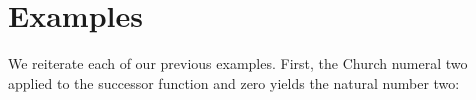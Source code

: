 \begin{fence}
\begin{code}
\AgdaSymbol{\{}\AgdaSpace{}%
\AgdaSpace{}%
\AgdaSymbol{:}\AgdaSpace{}%
\AgdaSpace{}%
\AgdaSpace{}%
\AgdaSymbol{\}}\<%
\\
\>[2][@{}l@{\AgdaIndent{0}}]%
\>[4]\AgdaSpace{}%
\AgdaSpace{}%
\AgdaSpace{}%
\<%
\\
%
\>[4]%
\>[1366I]\AgdaSpace{}%
\AgdaSpace{}%
\<%
\\
\>[.][@{}l@{}]\<[1366I]%
\>[6]\AgdaComment{------}\<%
\\
%
\>[4]\AgdaSpace{}%
\AgdaSpace{}%
\AgdaSpace{}%
\<%
\\
%
\\[\AgdaEmptyExtraSkip]%
\>[0]\AgdaSpace{}%
\AgdaSymbol{:}\AgdaSpace{}%
\AgdaSpace{}%
\AgdaSymbol{\{}\AgdaSpace{}%
\AgdaSymbol{\}}\AgdaSpace{}%
\AgdaSymbol{\{}\AgdaSpace{}%
\AgdaSpace{}%
\AgdaSymbol{:}\AgdaSpace{}%
\AgdaSpace{}%
\AgdaSpace{}%
\AgdaSymbol{\}}\<%
\\
\>[0][@{}l@{\AgdaIndent{0}}]%
\>[2]%
\>[1382I]\AgdaSpace{}%
\AgdaSpace{}%
\<%
\\
\>[.][@{}l@{}]\<[1382I]%
\>[4]\AgdaComment{------}\<%
\\
%
\>[2]\AgdaSpace{}%
\AgdaSpace{}%
\AgdaSpace{}%
\<%
\\
\>[0]\AgdaSpace{}%
\AgdaSpace{}%
\AgdaSymbol{=}\AgdaSpace{}%
\<%
\end{code}
\end{fence}

\hypertarget{examples}{%
\section{Examples}\label{examples}}

We reiterate each of our previous examples. First, the Church numeral
two applied to the successor function and zero yields the natural number
two:

